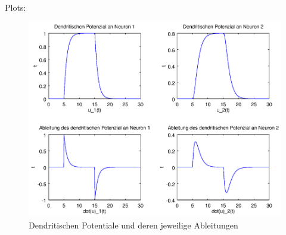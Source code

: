 \documentclass[DIN, pagenumber=false, fontsize=11pt, parskip=half]{scrartcl}
\begin{document}
    Plots:
    \begin{figure}[H]
        \includegraphics[width=\textwidth]{Plot}
        \caption{Dendritischen Potentiale und deren jeweilige Ableitungen}
    \end{figure} 
\end{document}
